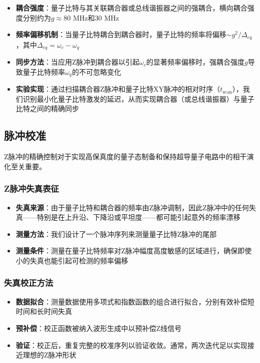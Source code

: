 \documentclass[11pt,a4paper]{article}
\begin{document}
\begin{itemize}
    \item \textbf{耦合强度}：量子比特与其关联耦合器或总线谐振器之间的强耦合，横向耦合强度分别约为$g \approx 80$ MHz和$30$ MHz
    \item \textbf{频率偏移机制}：当量子比特耦合到耦合器时，量子比特的频率将偏移$\sim g^2/\Delta_{eq}$，其中$\Delta_{eq} = \omega_c - \omega_q$
    \item \textbf{同步方法}：当应用Z脉冲到耦合器以引起$\omega_c$的显著频率偏移时，强耦合强度$g$导致量子比特频率$\omega_q$的不可忽略变化
    \item \textbf{实验实现}：通过扫描耦合器Z脉冲和量子比特XY脉冲的相对时序（$t_{\text{scan}}$），我们识别最小化量子比特激发的延迟，从而实现耦合器（或总线谐振器）与量子比特之间的精确同步
\end{itemize}

\subsection{脉冲校准}

Z脉冲的精确控制对于实现高保真度的量子态制备和保持超导量子电路中的相干演化至关重要。

\subsubsection{Z脉冲失真表征}

\begin{itemize}
    \item \textbf{失真来源}：由于量子比特和耦合器的频率由Z脉冲调制，因此Z脉冲中的任何失真——特别是在上升沿、下降沿或平坦度——都可能引起意外的频率漂移
    \item \textbf{测量方法}：我们设计了一个脉冲序列来测量量子比特Z脉冲的尾部
    \item \textbf{测量条件}：测量在量子比特频率对Z脉冲幅度高度敏感的区域进行，确保即使小的失真也能引起可检测的频率偏移
\end{itemize}

\subsubsection{失真校正方法}

\begin{itemize}
    \item \textbf{数据拟合}：测量数据使用多项式和指数函数的组合进行拟合，分别有效补偿短时间和长时间失真
    \item \textbf{预补偿}：校正函数被纳入波形生成中以预补偿Z线信号
    \item \textbf{验证}：校正后，重复完整的校准序列以验证收敛。通常，两次迭代足以实现接近理想的Z脉冲形状
\end{itemize}
\end{document}
